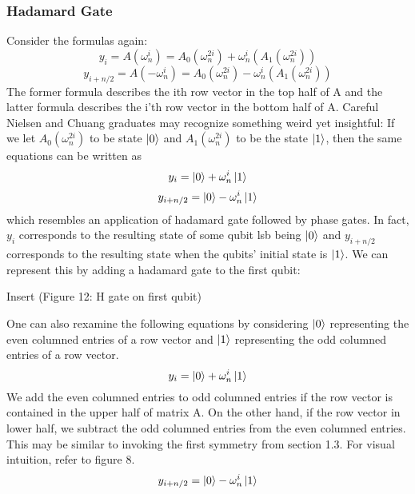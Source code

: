 \documentclass{article}
\newcommand{\om}{\omega_n}
\begin{document}
    \subsubsection{Hadamard Gate}
    Consider the formulas again:
    \[ y_{i} = A(\om^{i}) = A_0(\om^{2i}) +\om^i(A_1(\om^{2i})) \]
    \[ y_{i+n/2}= A(-\om^{i}) = A_0(\om^{2i}) -\om^i(A_1(\om^{2i})) \]
    The former formula describes the ith row vector in the top half of A and
    the latter formula describes the i'th row vector in the bottom half of A.
    Careful Nielsen and Chuang graduates may recognize something weird yet
    insightful: If we let \(A_0(\om^{2i})\) to be state \(\ket{0}\) and \(A_1(\om^{2i})\) to
    be the state \(\ket{1}\), then the same equations can be written as
    \[ y_{i} = \ket{0} +\om^i\ket{1} \]
    \[ y_{i+n/2} = \ket{0} -\om^i\ket{1} \]
    which resembles an application of hadamard gate followed by phase gates. In fact,
    \(y_{i}\) corresponds to the resulting
    state of some qubit lsb being \(\ket{0}\) and \(y_{i+n/2}\) corresponds to the resulting state
    when the qubits' initial state is \(\ket{1}\). We can represent this by adding
    a hadamard gate to the first qubit:

    Insert (Figure 12: H gate on first qubit)

    One can also rexamine the following equations by considering \(\ket{0}\) representing
    the even columned entries of a row vector and \(\ket{1}\) representing the odd columned
    entries of a row vector.
    \[ y_{i} = \ket{0} +\om^i\ket{1} \]
    We add the even columned entries to odd columned entries if the row vector is contained
    in the upper half of matrix A. On the other hand, if the row vector in lower half, we
    subtract the odd columned entries from the even columned entries. This may be
    similar to invoking the first symmetry from section 1.3. For visual intuition,
    refer to figure 8.
    \[ y_{i+n/2} = \ket{0} -\om^i\ket{1} \]
\end{document}
